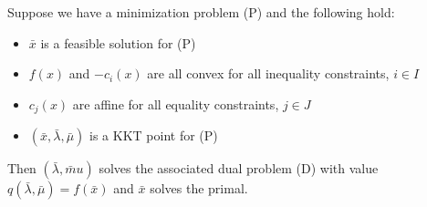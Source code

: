 \begin{theorem}
    Suppose we have a minimization problem (P) and the following hold:
    \begin{itemize}
        \item $\bar x$ is a feasible solution for (P)
        \item $f(x)$ and $-c_i(x)$ are all convex for all inequality constraints, $i \in I$
        \item $c_j(x)$ are affine for all equality constraints, $j \in J$
        \item $(\bar x, \bar \lambda, \bar \mu)$ is a KKT point for (P)
    \end{itemize}
    Then $(\bar \lambda, \bar mu)$ solves the associated dual problem (D) with value $q(\bar \lambda, \bar \mu) = f(\bar x)$ and $\bar x$ solves the primal.
\end{theorem}